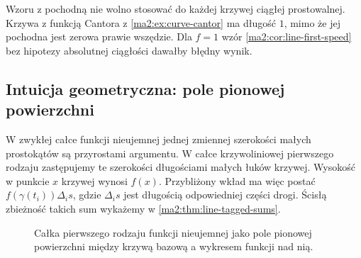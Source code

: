 Wzoru z pochodną nie wolno stosować do każdej
krzywej ciągłej prostowalnej. Krzywa z funkcją
Cantora z \ref{ma2:ex:curve-cantor} ma długość
$1$, mimo że jej pochodna jest zerowa
prawie wszędzie. Dla $f=1$ wzór
\ref{ma2:cor:line-first-speed} bez hipotezy
absolutnej ciągłości dawałby błędny wynik.


\subsection{Intuicja geometryczna: pole pionowej powierzchni}
\label{ma2:sec:line-curtain}

W zwykłej całce funkcji nieujemnej jednej zmiennej
szerokości małych prostokątów są przyrostami argumentu.
W całce krzywoliniowej pierwszego rodzaju zastępujemy
te szerokości długościami małych łuków krzywej.
Wysokość w punkcie $x$ krzywej wynosi $f(x)$.
Przybliżony wkład ma więc postać
$f(\gamma(t_i))\Delta_i s$, gdzie $\Delta_i s$
jest długością odpowiedniej części drogi.
Ścisłą zbieżność takich sum wykażemy w
\ref{ma2:thm:line-tagged-sums}.

\begin{figure}[htbp]
\centering
{}
\caption{Całka pierwszego rodzaju funkcji nieujemnej
jako pole pionowej powierzchni między krzywą bazową
a wykresem funkcji nad nią.}
\label{ma2:fig:line-curtain}
\end{figure}

